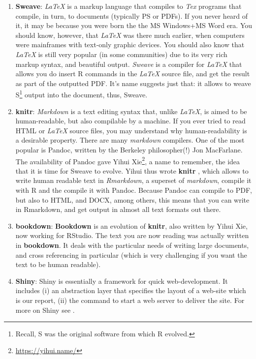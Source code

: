 \documentclass[]{book}
\renewcommand{\href}[2]{#2\footnote{\url{#1}}}
\theoremstyle{definition}
\theoremstyle{definition}
\theoremstyle{definition}
\theoremstyle{remark}
\begin{document}
\begin{enumerate}
\def\labelenumi{\arabic{enumi}.}
\item
  \textbf{Sweave}:
  \emph{LaTeX} is a markup language that compiles to \emph{Tex} programs that compile, in turn, to documents (typically PS or PDFs).
  If you never heard of it, it may be because you were born the the MS Windows+MS Word era.
  You should know, however, that \emph{LaTeX} was there much earlier, when computers were mainframes with text-only graphic devices.
  You should also know that \emph{LaTeX} is still very popular (in some communities) due to its very rich markup syntax, and beautiful output.
  \emph{Sweave} \citep{leisch2002sweave} is a compiler for \emph{LaTeX} that allows you do insert R commands in the \emph{LaTeX} source file, and get the result as part of the outputted PDF.
  It's name suggests just that: it allows to weave S\footnote{Recall, S was the original software from which R evolved.} output into the document, thus, Sweave.
\item
  \textbf{knitr}:
  \emph{Markdown} is a text editing syntax that, unlike \emph{LaTeX}, is aimed to be human-readable, but also compilable by a machine.
  If you ever tried to read HTML or \emph{LaTeX} source files, you may understand why human-readability is a desirable property.
  There are many \emph{markdown} compilers. One of the most popular is Pandoc, written by the Berkeley philosopher(!) Jon MacFarlane.
  The availability of Pandoc gave \href{https://yihui.name/}{Yihui Xie}, a name to remember, the idea that it is time for Sweave to evolve.
  Yihui thus wrote \textbf{knitr} \citep{xie2015dynamic}, which allows to write human readable text in \emph{Rmarkdown}, a superset of \emph{markdown}, compile it with R and the compile it with Pandoc.
  Because Pandoc can compile to PDF, but also to HTML, and DOCX, among others, this means that you can write in Rmarkdown, and get output in almost all text formats out there.
\item
  \textbf{bookdown}:
  \textbf{Bookdown} \citep{xie2016bookdown} is an evolution of \textbf{knitr}, also written by Yihui Xie, now working for RStudio.
  The text you are now reading was actually written in \textbf{bookdown}.
  It deals with the particular needs of writing large documents, and cross referencing in particular (which is very challenging if you want the text to be human readable).
\item
  \textbf{Shiny}:
  Shiny is essentially a framework for quick web-development.
  It includes (i) an abstraction layer that specifies the layout of a web-site which is our report, (ii) the command to start a web server to deliver the site.
  For more on Shiny see \citet{shiny}.
\end{enumerate}
\end{document}
